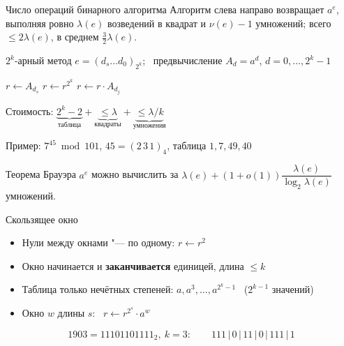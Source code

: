 \documentclass{ca-slides}
\begin{document}
\begin{theoremframe}{Число операций бинарного алгоритма}
  Алгоритм слева направо возвращает $a^e$, выполняя ровно $\lambda(e)$ возведений в квадрат
  и $\nu(e) - 1$ умножений; всего $\le 2\lambda(e)$, в среднем $\frac32\lambda(e)$.
\end{theoremframe}

\begin{canvasframe}{$2^k$-арный метод}
  $e = (d_s \dots d_0)_{2^k}$; \ предвычисление $A_d = a^d$, $d = 0, \dots, 2^k - 1$
  \begin{algorithmic}[1]
    \State $r \gets A_{d_s}$
      \State $r \gets r^{2^k}$ 
       $r \gets r \cdot A_{d_j}$ \EndIf
    \EndFor
  \end{algorithmic}
  \medskip
  Стоимость: $\underbrace{2^k - 2}_{\text{таблица}} + \underbrace{\le\lambda}_{\text{квадраты}}
  + \underbrace{\le \lambda/k}_{\text{умножения}}$
  \medskip

  Пример: $7^{45} \bmod 101$, $45 = (2\,3\,1)_4$, таблица $1, 7, 49, 40$
  \penspace[0.08\textheight]
\end{canvasframe}

\begin{theoremframe}{Теорема Брауэра}
  $a^e$ можно вычислить за
  $\lambda(e) + (1 + o(1))\dfrac{\lambda(e)}{\log_2 \lambda(e)}$ умножений.
\end{theoremframe}

\begin{canvasframe}{Скользящее окно}
  \begin{itemize}
    \item Нули между окнами "--- по одному: $r \gets r^2$
    \item Окно начинается и \textbf{заканчивается} единицей, длина $\le k$
    \item Таблица только нечётных степеней: $a, a^3, \dots, a^{2^k - 1}$ \ ($2^{k-1}$ значений)
    \item Окно $w$ длины $s$: \ $r \gets r^{2^s} \cdot a^w$
  \end{itemize}
  \[
    1903 = 11101101111_2, \ k = 3: \qquad 111\,|\,0\,|\,11\,|\,0\,|\,111\,|\,1
  \]
  \penspace[0.2\textheight]
\end{canvasframe}
\end{document}
